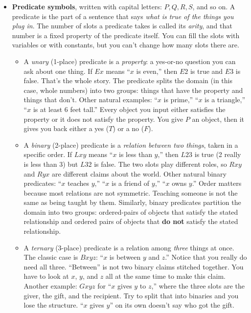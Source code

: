 \documentclass[11pt]{article}
\begin{document}
\begin{itemize}[leftmargin=*]
    \item \textbf{Predicate symbols}, written with capital letters: $P, Q, R, S$, and so on. A predicate is the part of a sentence that says \emph{what is true of the things you plug in}. The number of slots a predicate takes is called its \emph{arity}, and that number is a fixed property of the predicate itself. You can fill the slots with variables or with constants, but you can't change how many slots there are.
    \begin{itemize}
        \item A \emph{unary} (1-place) predicate is a \emph{property}: a yes-or-no question you can ask about one thing. If $Ex$ means ``$x$ is even,'' then $E2$ is true and $E3$ is false. That's the whole story. The predicate splits the domain (in this case, whole numbers) into two groups: things that have the property and things that don't. Other natural examples: ``$x$ is prime,'' ``$x$ is a triangle,'' ``$x$ is at least 6 feet tall.'' Every object you input either satisfies the property or it does not satisfy the property. You give $P$ an object, then it gives you back either a yes ($T$) or a no ($F$).
        \item A \emph{binary} (2-place) predicate is a \emph{relation between two things}, taken in a specific order. If $Lxy$ means ``$x$ is less than $y$,'' then $L23$ is true (2 really is less than 3) but $L32$ is false. The two slots play different roles, so $Rxy$ and $Ryx$ are different claims about the world. Other natural binary predicates: ``$x$ teaches $y$,'' ``$x$ is a friend of $y$,'' ``$x$ owns $y$.'' Order matters because most relations are not symmetric. Teaching someone is not the same as being taught by them. Similarly, binary predicates partition the domain into two groups: ordered-pairs of objects that satisfy the stated relationship and ordered pairs of objects that \textbf{do not} satisfy the stated relationship. 
        
        \item A \emph{ternary} (3-place) predicate is a relation among \emph{three} things at once. The classic case is $Bxyz$: ``$x$ is between $y$ and $z$.'' Notice that you really do need all three. ``Between'' is not two binary claims stitched together. You have to look at $x$, $y$, and $z$ all at the same time to make this claim. Another example: $Gxyz$ for ``$x$ gives $y$ to $z$,'' where the three slots are the giver, the gift, and the recipient. Try to split that into binaries and you lose the structure. ``$x$ gives $y$'' on its own doesn't say who got the gift.
    \end{itemize}


\end{itemize}
\end{document}
